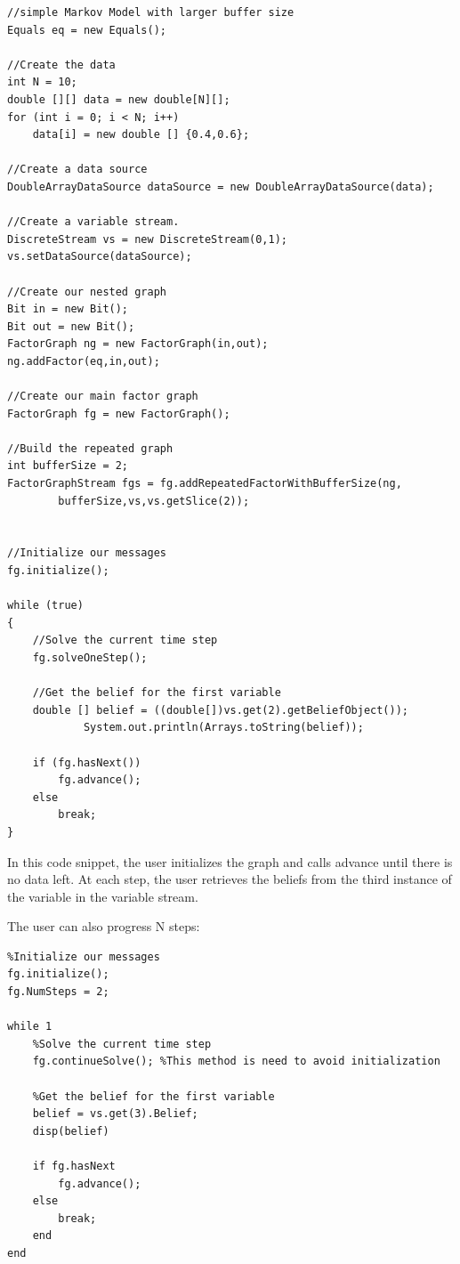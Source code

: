 \ifjava
\begin{lstlisting}
//simple Markov Model with larger buffer size
Equals eq = new Equals();

//Create the data
int N = 10;
double [][] data = new double[N][];
for (int i = 0; i < N; i++)
	data[i] = new double [] {0.4,0.6};

//Create a data source
DoubleArrayDataSource dataSource = new DoubleArrayDataSource(data);

//Create a variable stream.
DiscreteStream vs = new DiscreteStream(0,1);
vs.setDataSource(dataSource);

//Create our nested graph
Bit in = new Bit();
Bit out = new Bit();
FactorGraph ng = new FactorGraph(in,out);
ng.addFactor(eq,in,out);

//Create our main factor graph
FactorGraph fg = new FactorGraph();

//Build the repeated graph
int bufferSize = 2;
FactorGraphStream fgs = fg.addRepeatedFactorWithBufferSize(ng, 
		bufferSize,vs,vs.getSlice(2));


//Initialize our messages
fg.initialize();

while (true)
{
    //Solve the current time step
    fg.solveOneStep();
    
    //Get the belief for the first variable
    double [] belief = ((double[])vs.get(2).getBeliefObject());
    		System.out.println(Arrays.toString(belief));

    if (fg.hasNext())
    	fg.advance();
    else
    	break;
}
\end{lstlisting}
\fi

In this code snippet, the user initializes the graph and calls advance until there is no data left.  At each step, the user retrieves the beliefs from the third instance of the variable in the variable stream.

The user can also progress N steps:

\ifmatlab
\begin{lstlisting}
%Initialize our messages
fg.initialize();
fg.NumSteps = 2;

while 1
    %Solve the current time step
    fg.continueSolve(); %This method is need to avoid initialization
    
    %Get the belief for the first variable
    belief = vs.get(3).Belief;
    disp(belief)

    if fg.hasNext
        fg.advance();
    else
        break;
    end
end
\end{lstlisting}
\fi

